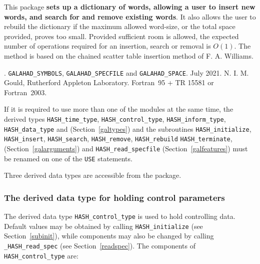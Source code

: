 \documentclass{galahad}
\newcommand{\packagename}{HASH}
\newcommand{\fullpackagename}{\libraryname\_\packagename}
\begin{document}
\galheader


\galsummary
This package {\bf sets up a dictionary of words, allowing a user to insert new
words, and search for and remove existing words}.  It also allows the user
to rebuild the dictionary if the maximum allowed word-size, or the
total space provided, proves too small.  Provided sufficient room is
allowed, the expected number of operations required for an insertion,
search or removal is $O(1)$.  The method is based on the chained
scatter table insertion method of F. A. Williams.


\galattributes
\galversions{\tt  \fullpackagename\_single, \fullpackagename\_double}.
\galuses
{\tt GALAHAD\_SY\-M\-BOLS},
{\tt GALAHAD\-\_SPECFILE}
and
{\tt GALAHAD\_SPACE}.
\galdate July 2021.
\galorigin N. I. M. Gould, Rutherford Appleton Laboratory.
\gallanguage Fortran~95 + TR 15581 or Fortran~2003.


\galhowto



\noindent
If it is required to use more than one of the modules at the same time, 
the derived types
{\tt \packagename\_time\_\-type},
{\tt \packagename\_control\_type},
{\tt \packagename\_inform\_type},
{\tt \packagename\_data\_type}
and
(Section~\ref{galtypes})
and the subroutines
{\tt \packagename\_initialize},
{\tt \packagename\_insert},
{\tt \packagename\-\_search},
{\tt \packagename\_remove},
{\tt \packagename\_rebuild}
{\tt \packagename\_terminate},
(Section~\ref{galarguments})
and
{\tt \packagename\_read\_specfile}
(Section~\ref{galfeatures})
must be renamed on one of the {\tt USE} statements.





\galtypes
Three derived data types are accessible from the package.


\subsubsection{The derived data type for holding control
 parameters}\label{typecontrol}
The derived data type
{\tt \packagename\_control\_type}
is used to hold controlling data. Default values may be obtained by calling
{\tt \packagename\_initialize}
(see Section~\ref{subinit}),
while components may also be changed by calling
{\tt \fullpackagename\_read\-\_spec}
(see Section~\ref{readspec}).
The components of
{\tt \packagename\_control\_type}
are:
\end{document}
